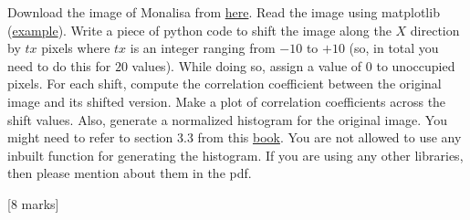 \begin{que}
	Download the image of Monalisa from
	\href{https://en.wikipedia.org/wiki/File:Mona_Lisa.jpg}{here}. Read the
	image using matplotlib
	(\href{https://people.ciirc.cvut.cz/~xmatousm/mfftdv/lab1.html}{example}).
	Write a piece of python code to shift the image along the $X$ direction
	by $tx$ pixels where $tx$ is an integer ranging from $-10$ to $+10$
	(so, in total you need to do this for $20$ values). While doing so,
	assign a value of $0$ to unoccupied pixels. For each shift, compute the
	correlation coefficient between the original image and its shifted
	version. Make a plot of correlation coefficients across the shift
	values. Also, generate a normalized histogram for the original image.
	You might need to refer to section 3.3 from this
	\href{https://dl.icdst.org/pdfs/files4/01c56e081202b62bd7d3b4f8545775fb.pdf}{book}.
	You are not allowed to use any inbuilt function for generating the
	histogram. If you are using any other libraries, then please mention
	about them in the pdf.

	\hspace*{\fill} [8 marks]
\end{que}

